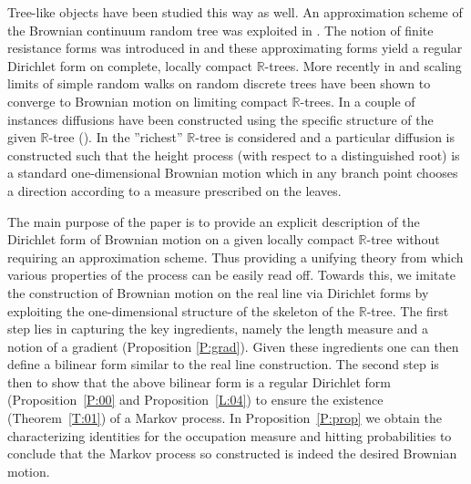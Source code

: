 \documentclass[11pt]{amsart}
\numberwithin{equation}{section}
\begin{document}
Tree-like objects have been studied this way as well.  An approximation scheme of the Brownian continuum random tree was exploited in \cite{Kre95}.  The notion of finite resistance forms was introduced in \cite{Kigami95} and these approximating forms yield a regular Dirichlet form on complete, locally compact ${{\mathbb R}}$-trees. More recently in \cite{Cro08} and \cite{Cro10} scaling limits of simple random walks on random discrete trees have been shown to converge  to Brownian motion on limiting compact ${{\mathbb R}}$-trees. In a couple of instances diffusions have been constructed using the specific structure of the given ${{\mathbb R}}$-tree (\cite{DJ93,Eva00}). In \cite{Eva00} the ''richest'' $\mathbb{R}$-tree is considered and a particular diffusion is constructed such that the height process (with respect to a distinguished root) is a standard one-dimensional Brownian motion which in any branch point chooses a direction according to a measure prescribed on the leaves.

The main purpose of the paper is to provide an explicit description of the Dirichlet form of Brownian motion on a given locally compact ${{\mathbb R}}$-tree without requiring an approximation scheme.  Thus providing a unifying theory from which various properties of the process can be easily read off. Towards this, we imitate the construction of Brownian motion on the real line via Dirichlet forms by  exploiting  the one-dimensional structure of the skeleton of the ${{\mathbb R}}$-tree.   The first step lies in capturing the key ingredients, namely the length measure and a notion of a gradient (Proposition \ref{P:grad}). Given these ingredients one can then define a bilinear form  similar to  the real line construction. The second step  is then to show that the above bilinear form is a  regular Dirichlet form (Proposition~\ref{P:00} and Proposition~\ref{L:04}) to  ensure the  existence (Theorem~\ref{T:01}) of  a Markov process.  In Proposition~\ref{P:prop} we obtain the characterizing identities for the  occupation measure and hitting probabilities to conclude that the Markov process so constructed is indeed the desired Brownian motion.
\end{document}
